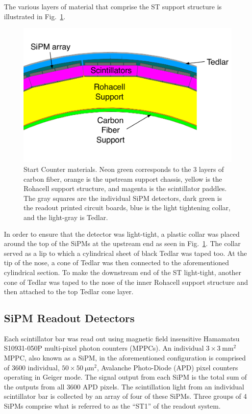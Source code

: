 The various layers of material that comprise the ST support structure is illustrated in Fig.~\ref{fig:stmaterials}.
	\begin{figure}[!htb]
		\centering
		\includegraphics[width=1.0\columnwidth]{design/figs/st_materials.pdf}
		\caption{Start Counter materials.  Neon green corresponds to the 3 layers of carbon fiber, orange is the upstream support chassis, yellow is the Rohacell support structure, and magenta is the scintillator paddles.  The gray squares are the individual SiPM detectors, dark green is the readout printed circuit boards, blue is the light tightening collar, and the light-gray is Tedlar.}
		\label{fig:stmaterials}
	\end{figure}
In order to ensure that the detector was light-tight, a plastic collar was placed around the top of the SiPMs at the upstream end as seen in Fig.~\ref{fig:stmaterials}.  The collar served as a lip to which a cylindrical sheet of black Tedlar was taped too.  At the tip of the nose, a cone of Tedlar was then connected to the aforementioned cylindrical section.  To make the downstream end of the ST light-tight, another cone of Tedlar was taped to the nose of the inner Rohacell support structure and then attached to the top Tedlar cone layer. 


\subsection{SiPM Readout Detectors} \label{sec:design_sipms}

Each scintillator bar was read out using magnetic field insensitive Hamamatsu S10931-050P multi-pixel photon counters (MPPCs)\cite{hamamatsu}.  An individual $\mathrm{3 \times 3\ mm^2}$ MPPC, also known as a SiPM, in the aforementioned configuration is comprised of 3600 individual, $\mathrm{50 \times 50\ \mu m^2}$, Avalanche Photo-Diode (APD) pixel counters operating in Geiger mode. The signal output from each SiPM is the total sum of the outputs from all 3600 APD pixels\cite{sipm_spec}.  The scintillation light from an individual scintillator bar is collected by an array of four of these SiPMs.  Three groups of 4 SiPMs comprise what is referred to as the ``ST1'' of the readout system.

